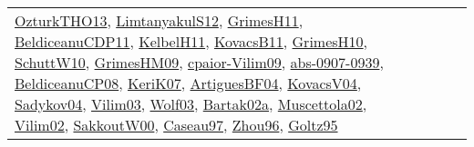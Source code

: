 {\begin{longtable}{lp{3cm}>{\raggedright}p{6cm}>{\raggedright}p{6cm}p{8cm}}
\href{articles/OzturkTHO13.pdf}{OzturkTHO13}\cite{OzturkTHO13}, \href{articles/LimtanyakulS12.pdf}{LimtanyakulS12}\cite{LimtanyakulS12}, \href{papers/GrimesH11.pdf}{GrimesH11}\cite{GrimesH11}, \href{articles/BeldiceanuCDP11.pdf}{BeldiceanuCDP11}\cite{BeldiceanuCDP11}, \href{articles/KelbelH11.pdf}{KelbelH11}\cite{KelbelH11}, \href{articles/KovacsB11.pdf}{KovacsB11}\cite{KovacsB11}, \href{papers/GrimesH10.pdf}{GrimesH10}\cite{GrimesH10}, \href{papers/SchuttW10.pdf}{SchuttW10}\cite{SchuttW10}, \href{papers/GrimesHM09.pdf}{GrimesHM09}\cite{GrimesHM09}, \href{papers/cpaior-Vilim09.pdf}{cpaior-Vilim09}\cite{cpaior-Vilim09}, \href{articles/abs-0907-0939.pdf}{abs-0907-0939}\cite{abs-0907-0939}, \href{papers/BeldiceanuCP08.pdf}{BeldiceanuCP08}\cite{BeldiceanuCP08}, \href{papers/KeriK07.pdf}{KeriK07}\cite{KeriK07}, \href{papers/ArtiguesBF04.pdf}{ArtiguesBF04}\cite{ArtiguesBF04}, \href{papers/KovacsV04.pdf}{KovacsV04}\cite{KovacsV04}, \href{papers/Sadykov04.pdf}{Sadykov04}\cite{Sadykov04}, \href{papers/Vilim03.pdf}{Vilim03}\cite{Vilim03}, \href{papers/Wolf03.pdf}{Wolf03}\cite{Wolf03}, \href{papers/Bartak02a.pdf}{Bartak02a}\cite{Bartak02a}, \href{papers/Muscettola02.pdf}{Muscettola02}\cite{Muscettola02}, \href{papers/Vilim02.pdf}{Vilim02}\cite{Vilim02}, \href{articles/SakkoutW00.pdf}{SakkoutW00}\cite{SakkoutW00}, \href{papers/Caseau97.pdf}{Caseau97}\cite{Caseau97}, \href{papers/Zhou96.pdf}{Zhou96}\cite{Zhou96}, \href{papers/Goltz95.pdf}{Goltz95}\cite{Goltz95}\\

\end{longtable}}
